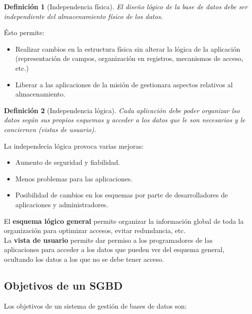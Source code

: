 \documentclass[12pt,spanish]{article}
\newtheorem{definition}{Definición}
\numberwithin{definition}{subsection}
\begin{document}
\begin{definition}[Independencia física]
	El diseño lógico de la base de datos debe ser independiente del almacenamiento físico de los datos.
\end{definition}

Ésto permite:

\begin{itemize}
	\item Realizar cambios en la estructura física sin alterar la lógica de la aplicación (representación de campos, organización en registros, mecanismos de acceso, etc.)
	\item Liberar a las aplicaciones de la misión de gestionara aspectos relativos al almacenamiento.
\end{itemize}

\begin{definition}[Independencia lógica]
	Cada aplicación debe poder organizar lso datos según sus propios esquemas y acceder a los datos que le son necesarios y le conciernen (vistas de usuario).
\end{definition}

La independecia lógica provoca varias mejoras:
\begin{itemize}
	\item Aumento de seguridad y fiabilidad.
	\item Menos problemas para las aplicaciones.
	\item Posibilidad de cambios en los esquemas por parte de desarrolladores de aplicaciones y administradores.
\end{itemize}

El \textbf{esquema lógico general} permite organizar la información global de toda la organización para optimizar accesos, evitar redundancia, etc.\\

La \textbf{vista de usuario} permite dar permiso a los programadores de las aplicaciones para acceder a los datos que pueden ver del esquema general, ocultando los datos a los que no se debe tener acceso.\\

\subsection{Objetivos de un SGBD}

Los objetivos de un sistema de gestión de bases de datos son:
\end{document}
